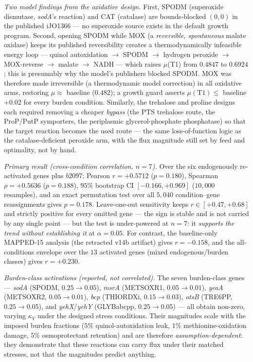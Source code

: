 \documentclass[11pt,a4paper]{article}
\theoremstyle{plain}
\theoremstyle{definition}
\theoremstyle{remark}
\begin{document}
\emph{Two model findings from the oxidative design.} First, SPODM
(superoxide dismutase, \emph{sodA}'s reaction) and CAT (catalase) are
bounds-blocked $(0,0)$ in the published iJO1366 --- no superoxide
source exists in the default growth program. Second, opening SPODM
while MOX (a \emph{reversible, spontaneous} malate oxidase) keeps its
published reversibility creates a thermodynamically infeasible energy
loop --- quinol autoxidation $\to$ SPODM $\to$ hydrogen peroxide
$\to$ MOX-reverse $\to$ malate $\to$ NADH --- which raises $\mu$(T1)
from $0.4847$ to $0.6924$; this is presumably why the model's
publishers blocked SPODM. MOX was therefore made irreversible (a
thermodynamic model correction) in all oxidative arms, restoring
$\mu \approx$ baseline ($0.482$); a growth guard asserts
$\mu(\mathrm{T1}) \le$ baseline $+ 0.02$ for every burden condition.
Similarly, the trehalose and proline designs each required removing a
cheaper \emph{bypass} (the PTS trehalose route, the ProP/PutP
symporters, the periplasmic glycerol-phosphate phosphatase) so that
the target reaction becomes the used route --- the same
loss-of-function logic as the catalase-deficient peroxide arm, with
the flux magnitude still set by feed and optimality, not by hand.

\emph{Primary result (cross-condition correlation, $n=7$).} Over the
six endogenously re-activated genes plus $b2097$: Pearson
$r = +0.5712$ ($p = 0.180$), Spearman $\rho = +0.5636$
($p = 0.188$), $95\%$ bootstrap CI $[-0.166, +0.969]$ ($10{,}000$
resamples), and an exact permutation test over all $5{,}040$
condition--gene reassignments gives $p = 0.178$. Leave-one-out
sensitivity keeps $r \in [+0.47, +0.68]$ and strictly positive for
every omitted gene --- the sign is stable and is not carried by any
single point --- but the test is under-powered at $n=7$: it
\emph{supports the trend without establishing it} at $\alpha = 0.05$. For
contrast, the baseline-only MAPPED-15 analysis (the retracted v14b
artifact) gives $r = -0.158$, and the all-conditions envelope over
the $13$ activated genes (mixed endogenous/burden classes) gives
$r = +0.230$.

\emph{Burden-class activations (reported, not correlated).} The seven
burden-class genes --- \emph{sodA} (SPODM, $0.25 \to 0.05$),
\emph{msrA} (METSOXR1, $0.05 \to 0.01$), \emph{yeaA} (METSOXR2,
$0.05 \to 0.01$), \emph{bcp} (THIORDXi, $0.15 \to 0.03$),
\emph{otsB} (TRE6PP, $0.25 \to 0.05$), and \emph{yehX}/\emph{yehY}
(GLYBabcpp, $0.25 \to 0.05$) --- all obtain non-zero, varying
$\kappa_V$ under the designed stress conditions. Their magnitudes
scale with the imposed burden fractions ($5\%$ quinol-autoxidation
leak, $1\%$ methionine-oxidation damage, $5\%$ osmoprotectant
retention) and are therefore \emph{assumption-dependent}: they
demonstrate that these reactions can carry flux under their matched
stresses, not that the magnitudes predict anything.
\end{document}
